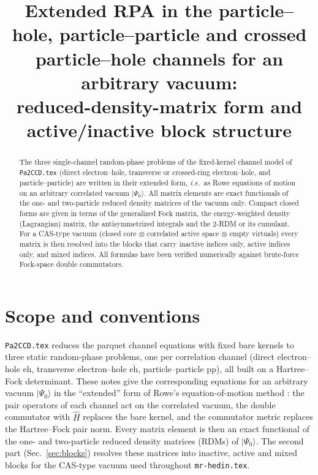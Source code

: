 \documentclass[aip,jcp,reprint,noshowkeys,superscriptaddress]{revtex4-1}
\newcommand{\ie}{\textit{i.e.}}
\newcommand{\eh}{\text{eh}}
\newcommand{\teh}{\overline{\text{eh}}}
\newcommand{\pp}{\text{pp}}
\begin{document}
\title{Extended RPA in the particle--hole, particle--particle and crossed particle--hole channels for an arbitrary vacuum:\\ reduced-density-matrix form and active/inactive block structure}

\begin{abstract}
The three single-channel random-phase problems of the fixed-kernel channel model of
\texttt{Pa2CCD.tex} (direct electron--hole, transverse or crossed-ring electron--hole,
and particle--particle) are written in their extended form, \ie\ as Rowe
equations of motion on an arbitrary correlated vacuum $|\Psi_0\rangle$.  All matrix
elements are exact functionals of the one- and two-particle reduced density
matrices of the vacuum only.  Compact closed forms are given in terms of the
generalized Fock matrix, the energy-weighted density (Lagrangian) matrix, the
antisymmetrized integrals and the 2-RDM or its cumulant.  For a CAS-type vacuum
(closed core $\otimes$ correlated active space $\otimes$ empty virtuals) every
matrix is then resolved into the blocks that carry inactive indices only,
active indices only, and mixed indices.  All formulas have been verified
numerically against brute-force Fock-space double commutators.
\end{abstract}

\maketitle

\section{Scope and conventions}
\label{sec:conventions}

\texttt{Pa2CCD.tex} reduces the parquet channel equations with fixed bare
kernels to three static random-phase problems, one per correlation channel
(direct electron--hole $\eh$, transverse electron--hole $\teh$, particle--particle
$\pp$), all built on a Hartree--Fock determinant.  These notes give the
corresponding equations for an arbitrary vacuum $|\Psi_0\rangle$ in the
``extended'' form of Rowe's equation-of-motion method
\cite{Rowe1968,ChatterjeePernal2012}: the pair operators of each channel act on
the correlated vacuum, the double commutator with $\hat H$ replaces the bare
kernel, and the commutator metric replaces the Hartree--Fock pair norm.  Every
matrix element is then an exact functional of the one- and two-particle reduced
density matrices (RDMs) of $|\Psi_0\rangle$.  The second part
(Sec.~\ref{sec:blocks}) resolves these matrices into inactive, active and mixed
blocks for the CAS-type vacuum used throughout \texttt{mr-hedin.tex}.
\end{document}
